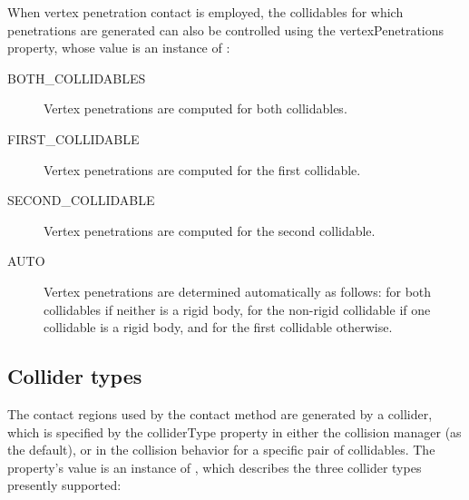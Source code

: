 When vertex penetration contact is employed, the collidables for which
penetrations are generated can also be controlled using the {\sf
vertexPenetrations} property, whose value is an instance of
:

\begin{description}

\item[BOTH\_COLLIDABLES]\mbox{}

Vertex penetrations are computed for both collidables.

\item[FIRST\_COLLIDABLE]\mbox{}

Vertex penetrations are computed for the first collidable.

\item[SECOND\_COLLIDABLE]\mbox{}

Vertex penetrations are computed for the second collidable.

\item[AUTO]\mbox{}

Vertex penetrations are determined automatically as follows: for both
collidables if neither is a rigid body, for the non-rigid collidable
if one collidable is a rigid body, and for the first collidable
otherwise.

\end{description}

\subsection{Collider types}
\label{ColliderTypes:sec}

The contact regions used by the contact method are generated by
a collider, which is specified by the {\sf colliderType} property in
either the collision manager (as the default), or in the collision
behavior for a specific pair of collidables. The property's value is an
instance of
,
which describes the three collider types presently supported:

